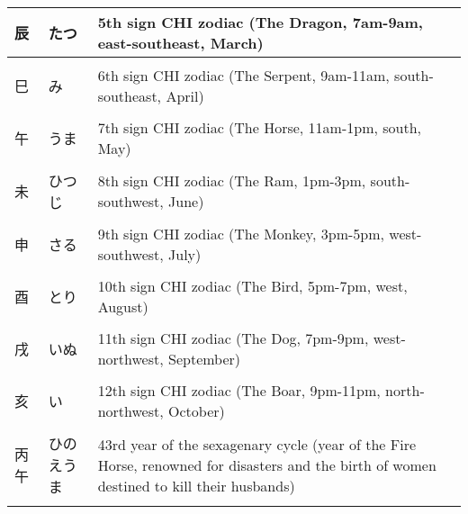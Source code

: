 \documentclass{article}
\begin{document}
\begin{tabular}{ l | l | p{10.5cm} }
辰		&たつ		&5th sign CHI zodiac (The Dragon, 7am-9am, east-southeast, March) \\ \hline \\[-1em]
巳		&み		&6th sign CHI zodiac (The Serpent, 9am-11am, south-southeast, April) \\ \hline \\[-1em]
午		&うま		&7th sign CHI zodiac (The Horse, 11am-1pm, south, May) \\ \hline \\[-1em]
未		&ひつじ		&8th sign CHI zodiac (The Ram, 1pm-3pm, south-southwest, June) \\ \hline \\[-1em]
申		&さる		&9th sign CHI zodiac (The Monkey, 3pm-5pm, west-southwest, July) \\ \hline \\[-1em]
酉		&とり		&10th sign CHI zodiac (The Bird, 5pm-7pm, west, August) \\ \hline \\[-1em]
戌		&いぬ		&11th sign CHI zodiac (The Dog, 7pm-9pm, west-northwest, September) \\ \hline \\[-1em]
亥		&い		&12th sign CHI zodiac (The Boar, 9pm-11pm, north-northwest, October) \\ \hline \\[-1em]
丙午		& ひのえうま	&43rd year of the sexagenary cycle (year of the Fire Horse, renowned for disasters and the birth of women destined to kill their husbands) \\ \hline \\[-1em]
\end{tabular}
\end{document}
